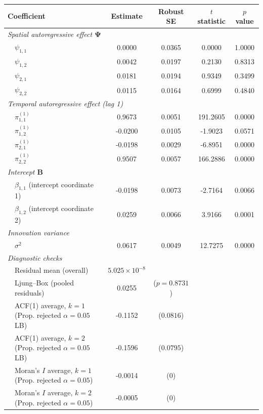 \documentclass[12pt]{article}
\theoremstyle{plain}
\theoremstyle{definition}
\newcommand{\xmat}{\mathbf}
\begin{document}
\begin{table}[t]
\centering
\scriptsize{
\begin{tabular}{cl cccc}
\hline
\multicolumn{2}{l}{Coefficient} & Estimate & Robust SE & $t$ statistic & $p$ value \\
\hline
\multicolumn{6}{l}{\emph{Spatial autoregressive effect $\xmat{\Psi}$}} \\
& $\psi_{1,1}$ & 0.0000 & 0.0365 & 0.0000 & 1.0000 \\
& $\psi_{1,2}$ & 0.0042 & 0.0197 & 0.2130 & 0.8313 \\
& $\psi_{2,1}$ & 0.0181 & 0.0194 & 0.9349 & 0.3499 \\
& $\psi_{2,2}$ & 0.0115 & 0.0164 & 0.6999 & 0.4840 \\
\hline
\multicolumn{6}{l}{\emph{Temporal autoregressive effect (lag 1)}} \\
& $\pi^{(1)}_{1,1}$ & 0.9673 & 0.0051 & 191.2605 & 0.0000 \\
& $\pi^{(1)}_{1,2}$ & -0.0200 & 0.0105 & -1.9023 & 0.0571 \\
& $\pi^{(1)}_{2,1}$ & -0.0198 & 0.0029 & -6.8951 & 0.0000 \\
& $\pi^{(1)}_{2,2}$ & 0.9507 & 0.0057 & 166.2886 & 0.0000 \\
\hline
\multicolumn{6}{l}{\emph{Intercept $\xmat{B}$}} \\
& $\beta_{1,1}$ (intercept coordinate 1) & -0.0198 & 0.0073 & -2.7164 & 0.0066 \\
& $\beta_{1,2}$ (intercept coordinate 2) & 0.0259 & 0.0066 & 3.9166 & 0.0001 \\
\hline
\multicolumn{6}{l}{\emph{Innovation variance}} \\
& $\sigma^2$ & 0.0617 & 0.0049 & 12.7275 & 0.0000 \\
\hline
\multicolumn{6}{l}{\emph{Diagnostic checks}} \\
& Residual mean (overall) & $5.025 \times 10^{-8}$ &  &  &  \\[.1cm]
& Ljung--Box (pooled residuals) & 0.0255 & ($p=0.8731$) &  &  \\
& ACF(1) average, $k=1$ (Prop. rejected $\alpha=0.05$ LB) & -0.1152 & ($0.0816$) &  &  \\
& ACF(1) average, $k=2$ (Prop. rejected $\alpha=0.05$ LB) & -0.1596 & ($0.0795$) &  &  \\
& Moran's $I$ average, $k=1$ (Prop. rejected $\alpha=0.05$) & -0.0014 & ($0$) &  &  \\
& Moran's $I$ average, $k=2$ (Prop. rejected $\alpha=0.05$) & -0.0005 & ($0$) &  &  \\

\end{tabular}}
\end{table}
\end{document}
